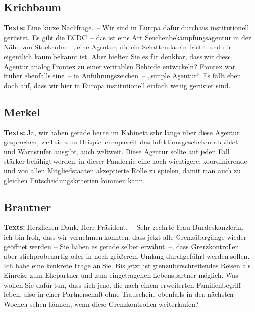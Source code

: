 \documentclass{article}
\begin{document}
\subsection{Krichbaum}
\noindent\textbf{Texts:} Eine kurze Nachfrage. – Wir sind in Europa dafür durchaus institutionell gerüstet. Es gibt die ECDC – das ist eine Art Seuchenbekämpfungsagentur in der Nähe von Stockholm –, eine Agentur, die ein Schattendasein fristet und die eigentlich kaum bekannt ist. Aber hielten Sie es für denkbar, dass wir diese Agentur analog Frontex zu einer veritablen Behörde entwickeln? Frontex war früher ebenfalls eine – in Anführungszeichen – „simple Agentur“. Es fällt eben doch auf, dass wir hier in Europa institutionell einfach wenig gerüstet sind.

\subsection{Merkel}
\noindent\textbf{Texts:} Ja, wir haben gerade heute im Kabinett sehr lange über diese Agentur gesprochen, weil sie zum Beispiel europaweit das Infektionsgeschehen abbildet und Warnstufen ausgibt, auch weltweit. Diese Agentur sollte auf jeden Fall stärker befähigt werden, in dieser Pandemie eine noch wichtigere, koordinierende und von allen Mitgliedstaaten akzeptierte Rolle zu spielen, damit man auch zu gleichen Entscheidungskriterien kommen kann.

\subsection{Brantner}
\noindent\textbf{Texts:} Herzlichen Dank, Herr Präsident. – Sehr geehrte Frau Bundeskanzlerin, ich bin froh, dass wir vernehmen konnten, dass jetzt alle Grenzübergänge wieder geöffnet werden – Sie haben es gerade selber erwähnt –, dass Grenzkontrollen aber stichprobenartig oder in noch größerem Umfang durchgeführt werden sollen. Ich habe eine konkrete Frage an Sie. Bis jetzt ist grenzüberschreitendes Reisen als Einreise zum Ehepartner und zum eingetragenen Lebenspartner möglich. Was wollen Sie dafür tun, dass sich jene, die nach einem erweiterten Familienbegriff leben, also in einer Partnerschaft ohne Trauschein, ebenfalls in den nächsten Wochen sehen können, wenn diese Grenzkontrollen weiterlaufen?
\end{document}
